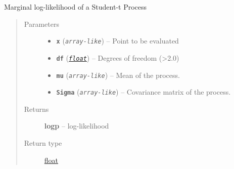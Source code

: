 \documentclass[letterpaper,10pt,english]{sphinxmanual}
\begin{document}
\begin{fulllineitems}
\label{pyGPGO.surrogates.tStudentProcess:pyGPGO.surrogates.tStudentProcess.logpdf}
Marginal log-likelihood of a Student-t Process
\begin{quote}\begin{description}
\item[{Parameters}] \leavevmode\begin{itemize}
\item {} 
\textbf{\texttt{x}} (\emph{\texttt{array-like}}) -- Point to be evaluated

\item {} 
\textbf{\texttt{df}} (\href{https://docs.python.org/2/library/functions.html\#float}{\emph{\texttt{float}}}) -- Degrees of freedom (\textgreater{}2.0)

\item {} 
\textbf{\texttt{mu}} (\emph{\texttt{array-like}}) -- Mean of the process.

\item {} 
\textbf{\texttt{Sigma}} (\emph{\texttt{array-like}}) -- Covariance matrix of the process.

\end{itemize}

\item[{Returns}] \leavevmode
\textbf{logp} -- log-likelihood

\item[{Return type}] \leavevmode
\href{https://docs.python.org/2/library/functions.html\#float}{float}

\end{description}\end{quote}

\end{fulllineitems}

\end{document}
